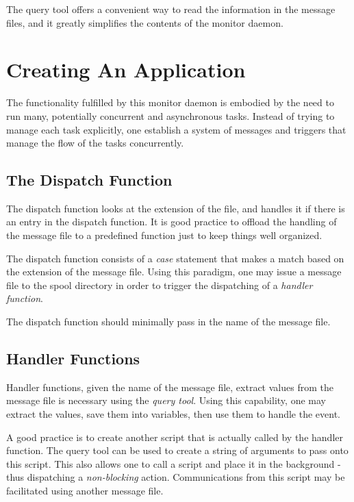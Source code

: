 \documentclass[11pt,twocolumn]{article}
\begin{document}
The query tool offers a convenient way to read the information in the message files, and it greatly simplifies the contents of the monitor daemon.

\section{Creating An Application}
\label{sec-application}

The functionality fulfilled by this monitor daemon is embodied by the need to run many, potentially concurrent and asynchronous tasks.  Instead of trying to manage each task explicitly, one establish a system of messages and triggers that manage the flow of the tasks concurrently. 

\subsection{The Dispatch Function}
\label{subsec-dispatch}

The dispatch function looks at the extension of the file, and handles it if there is an entry in the dispatch function. It is good practice to offload the handling of the message file to a predefined function just to keep things well organized.

The dispatch function consists of a \textit{case} statement that makes a match based on the extension of the message file. Using this paradigm, one may issue a message file to the spool directory in order to trigger the dispatching of a \textit{handler function}.

The dispatch function should minimally pass in the name of the message file.

\subsection{Handler Functions}
\label{subsec-dispatch}

Handler functions, given the name of the message file, extract values from the message file is necessary using the \textit{query tool}. Using this capability, one may extract the values, save them into variables, then use them to handle the event.

A good practice is to create another script that is actually called by the handler function.  The query tool can be used to create a string of arguments to pass onto this script.  This also allows one to call a script and place it in the background - thus dispatching a \textit{non-blocking} action.  Communications from this script may be facilitated using another message file.
\end{document}

